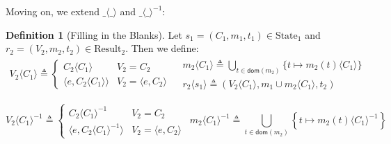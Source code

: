 \documentclass{article}
\theoremstyle{definition}
\newtheorem{definition}{Definition}[section]
\newcommand*{\mem}{m}
\newcommand*{\State}{\text{State}}
\newcommand*{\Result}{\text{Result}}
\newcommand*{\inject}[2]{{#2}\langle{#1}\rangle}
\newcommand*{\delete}[2]{{#2}{\langle{#1}\rangle}^{-1}}
\begin{document}
Moving on, we extend $\inject{\_}{\_}$ and $\delete{\_}{\_}$:
\begin{definition}[Filling in the Blanks]
  Let $s_1=(C_1,\mem_1,t_1)\in\State_1$ and $r_2=(V_2,\mem_2,t_2)\in\Result_2$. Then we define:
  \[
    \begin{array}{cc}
      \inject{C_1}{V_2}\triangleq
      \begin{cases}
        \inject{C_1}{C_2}                  & V_2=C_2                   \\
        \langle e,\inject{C_1}{C_2}\rangle & V_2=\langle e, C_2\rangle
      \end{cases} &
      \begin{array}{l}
        \inject{C_1}{\mem_2}\triangleq
        \displaystyle\bigcup_{t\in\mathsf{dom}(\mem_2)}\{t\mapsto\inject{C_1}{\mem_2(t)}\} \\
        \inject{s_1}{r_2}\triangleq
        (\inject{C_1}{V_2},\mem_1\cup\inject{C_1}{\mem_2},t_2)
      \end{array}
    \end{array}
  \]

  \[
    \delete{C_1}{V_2}\triangleq
    \begin{cases}
      \delete{C_1}{C_2}                  & V_2=C_2                   \\
      \langle e,\delete{C_1}{C_2}\rangle & V_2=\langle e, C_2\rangle
    \end{cases}\:\:
    \delete{C_1}{\mem_2}\triangleq
    \displaystyle\bigcup_{t\in\mathsf{dom}(\mem_2)}\left\{t\mapsto\delete{C_1}{\mem_2(t)}\right\}
  \]
\end{definition}
\end{document}
